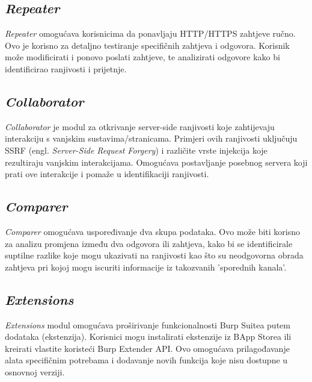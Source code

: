 \subsection{\textit{Repeater}}
\textit{Repeater} omogućava korisnicima da ponavljaju HTTP/HTTPS zahtjeve ručno. Ovo je korisno za detaljno testiranje specifičnih zahtjeva i odgovora. Korisnik može modificirati i 
ponovo poslati zahtjeve, te analizirati odgovore kako bi identificirao ranjivosti i prijetnje.\cite{burp_feat}

\subsection{\textit{Collaborator}}
\textit{Collaborator} je modul za otkrivanje server-side ranjivosti koje zahtijevaju interakciju s vanjskim sustavima/stranicama. Primjeri ovih ranjivosti uključuju 
SSRF (engl. \textit{Server-Side Request Forgery}) i različite vrste injekcija koje rezultiraju vanjskim interakcijama. Omogućava postavljanje posebnog servera koji prati 
ove interakcije i pomaže u identifikaciji ranjivosti.\cite{burp_feat}

\subsection{\textit{Comparer}}
\textit{Comparer} omogućava uspoređivanje dva skupa podataka. Ovo može biti korisno za analizu promjena između dva odgovora ili zahtjeva, kako bi se identificirale suptilne razlike koje 
mogu ukazivati na ranjivosti kao što su neodgovorna obrada zahtjeva pri kojoj mogu iscuriti informacije iz takozvanih 'sporednih kanala'. \cite{burp_feat}

\subsection{\textit{Extensions}}
\textit{Extensions} modul omogućava proširivanje funkcionalnosti Burp Suitea putem dodataka (ekstenzija). Korisnici mogu instalirati ekstenzije iz BApp Storea ili kreirati 
vlastite koristeći Burp Extender API. Ovo omogućava prilagođavanje alata specifičnim potrebama i dodavanje novih funkcija koje nisu dostupne u osnovnoj verziji.\cite{burp_feat}


\newpage
